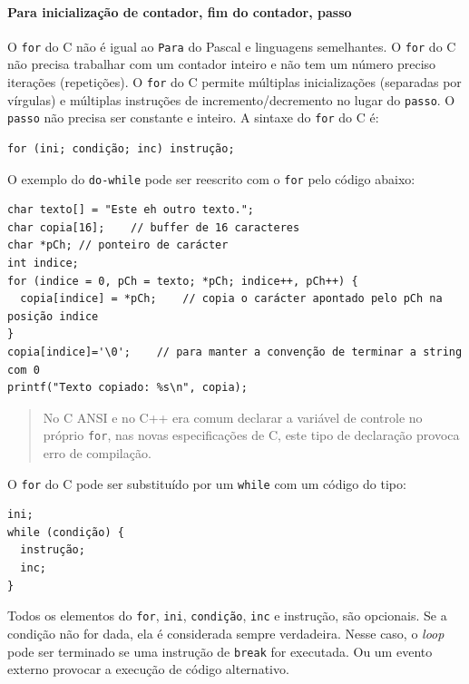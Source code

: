 \documentclass[
]{article}
\begin{document}
\hypertarget{para-inicializauxe7uxe3o-de-contador-fim-do-contador-passo}{%
\paragraph{Para inicialização de contador, fim do contador,
passo}\label{para-inicializauxe7uxe3o-de-contador-fim-do-contador-passo}}

O \texttt{for} do C não é igual ao \texttt{Para} do Pascal e linguagens
semelhantes. O \texttt{for} do C não precisa trabalhar com um contador
inteiro e não tem um número preciso iterações (repetições). O
\texttt{for} do C permite múltiplas inicializações (separadas por
vírgulas) e múltiplas instruções de incremento/decremento no lugar do
\texttt{passo}. O \texttt{passo} não precisa ser constante e inteiro. A
sintaxe do \texttt{for} do C é:

\begin{verbatim}
for (ini; condição; inc) instrução;
\end{verbatim}

O exemplo do \texttt{do-while} pode ser reescrito com o \texttt{for}
pelo código abaixo:

\begin{verbatim}
char texto[] = "Este eh outro texto.";
char copia[16];    // buffer de 16 caracteres
char *pCh; // ponteiro de carácter
int indice;
for (indice = 0, pCh = texto; *pCh; indice++, pCh++) {
  copia[indice] = *pCh;    // copia o carácter apontado pelo pCh na posição indice
}
copia[indice]='\0';    // para manter a convenção de terminar a string com 0
printf("Texto copiado: %s\n", copia);
\end{verbatim}

\begin{quote}
No C ANSI e no C++ era comum declarar a variável de controle no próprio
\texttt{for}, nas novas especificações de C, este tipo de declaração
provoca erro de compilação.
\end{quote}

O \texttt{for} do C pode ser substituído por um \texttt{while} com um
código do tipo:

\begin{verbatim}
ini;
while (condição) {
  instrução;
  inc;
}
\end{verbatim}

Todos os elementos do \texttt{for}, \texttt{ini}, \texttt{condição},
\texttt{inc} e instrução, são opcionais. Se a condição não for dada, ela
é considerada sempre verdadeira. Nesse caso, o \emph{loop} pode ser
terminado se uma instrução de \texttt{break} for executada. Ou um evento
externo provocar a execução de código alternativo.
\end{document}
